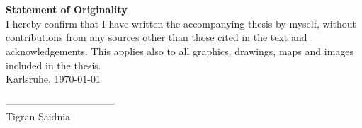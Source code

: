 \chapter*{}
\begin{flushleft}
\vspace{11cm}
\textbf{Statement of Originality}\\[1cm]
I hereby confirm that I have written the accompanying thesis by myself, without contributions from any sources other than those cited in the text and acknowledgements. This applies also to all graphics, drawings, maps and images included in the thesis.\\[1cm]

Karlsruhe, \today \\[1cm]
\end{flushleft}

\begin{center}
---------------------------------\\
Tigran Saidnia
\end{center}

